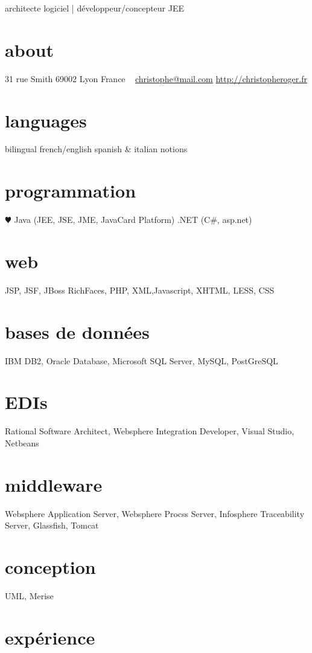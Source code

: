 \documentclass[print]{roger-cv}
\begin{document}
       {architecte logiciel | développeur/concepteur JEE}


\begin{aside}
  \section{about}
    31 rue Smith
    69002 Lyon
    France
    ~
    \href{mailto:christophe@mail.com}{christophe@mail.com}
    \href{http://christopheroger.fr}{http://christopheroger.fr}
  \section{languages}
    bilingual french/english
    spanish \& italian notions
  \section{programmation}
    {\color{red} $\varheartsuit$} Java (JEE, JSE, JME, JavaCard Platform)
    .NET (C\#, asp.net)
  \section{web}
    {JSP, JSF, JBoss RichFaces, PHP, XML,Javascript, XHTML, LESS, CSS}
  \section{bases de données}
    {IBM DB2, Oracle Database, Microsoft SQL Server, MySQL, PostGreSQL}
  \section{EDIs}
    {Rational Software Architect, Websphere Integration Developer, Visual Studio, Netbeans}
  \section{middleware}
    {Websphere Application Server, Websphere Procss Server, Infosphere Traceability Server, Glassfish, Tomcat}
  \section{conception}
    {UML, Merise}
\end{aside}

\section{expérience}
\end{document}
